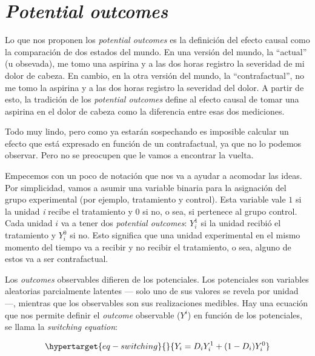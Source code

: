 \documentclass[
  letterpaper,
  DIV=11,
  numbers=noendperiod,
  oneside]{scrreprt}
\begin{document}
\hypertarget{potential-outcomes}{%
\section{\texorpdfstring{\emph{Potential
outcomes}}{Potential outcomes}}\label{potential-outcomes}}

Lo que nos proponen los \emph{potential outcomes} es la definición del
efecto causal como la comparación de dos estados del mundo. En una
versión del mundo, la ``actual'' (u obsevada), me tomo una aspirina y a
las dos horas registro la severidad de mi dolor de cabeza. En cambio, en
la otra versión del mundo, la ``contrafactual'', no me tomo la aspirina
y a las dos horas registro la severidad del dolor. A partir de esto, la
tradición de los \emph{potential outcomes} define al efecto causal de
tomar una aspirina en el dolor de cabeza como la diferencia entre esas
dos mediciones.

Todo muy lindo, pero como ya estarán sospechando es imposible calcular
un efecto que está expresado en función de un contrafactual, ya que no
lo podemos observar. Pero no se preocupen que le vamos a encontrar la
vuelta.

Empecemos con un poco de notación que nos va a ayudar a acomodar las
ideas. Por simplicidad, vamos a asumir una variable binaria para la
asignación del grupo experimental (por ejemplo, tratamiento y control).
Esta variable vale \(1\) si la unidad \emph{i} recibe el tratamiento y
\(0\) si no, o sea, si pertenece al grupo control. Cada unidad \(i\) va
a tener dos \emph{potential outcomes}: \(Y_i^1\) si la unidad recibió el
tratamiento y \(Y_i^0\) si no. Esto significa que una unidad
experimental en el mismo momento del tiempo va a recibir y no recibir el
tratamiento, o sea, alguno de estos va a ser contrafactual.

Los \emph{outcomes} observables difieren de los potenciales. Los
potenciales son variables aleatorias parcialmente latentes --- solo uno
de sus valores se revela por unidad ---, mientras que los observables
son sus realizaciones medibles. Hay una ecuación que nos permite definir
el \emph{outcome} observable (\(Y^i\)) en función de los potenciales, se
llama la \emph{switching equation}:

\begin{equation}\protect\hypertarget{eq-switching}{}{
Y_i = D_i Y_i^1 + (1-D_i) Y_i^0 
}\label{eq-switching}\end{equation}
\end{document}
